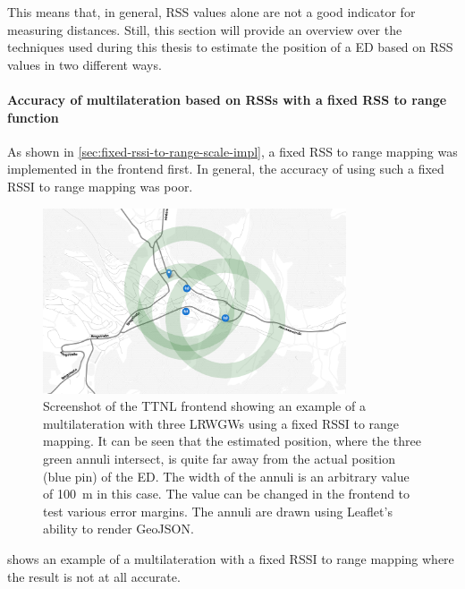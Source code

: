 This means that, in general, \ac{RSS} values alone are not a good indicator for measuring distances.
Still, this section will provide an overview over the techniques used during this thesis to estimate the position of a \acl{ED} based on \ac{RSS} values in two different ways.

\paragraph{Accuracy of multilateration based on \aclp{RSS} with a fixed \acl{RSS} to range function}\label{subsubsec:conclusion-rssi-fixed-scale}

As shown in \cref{sec:fixed-rssi-to-range-scale-impl}, a fixed \ac{RSS} to range mapping was implemented in the frontend first.
In general, the accuracy of using such a fixed \ac{RSSI} to range mapping was poor.

\begin{figure}[htbp]
    \centering
    \includegraphics[width=0.8\textwidth]{pictures/ttn-locator/frontend/multilateration/rssi_range_multilateration_bad_example.png}
    \caption{
        Screenshot of the \ac{TTNL} frontend showing an example of a multilateration with three \aclp{LRWGW} using a fixed \ac{RSSI} to range mapping.
        It can be seen that the estimated position, where the three green annuli intersect, is quite far away from the actual position (blue pin) of the \acl{ED}.
        The width of the annuli is an arbitrary value of \SI{100}{\meter} in this case.
        The value can be changed in the frontend to test various error margins.
        The annuli are drawn using Leaflet's ability to render GeoJSON.
    }\label{pic:bad-rssi-to-range-multilateration-example}
\end{figure}

 shows an example of a multilateration with a fixed \ac{RSSI} to range mapping where the result is not at all accurate.

